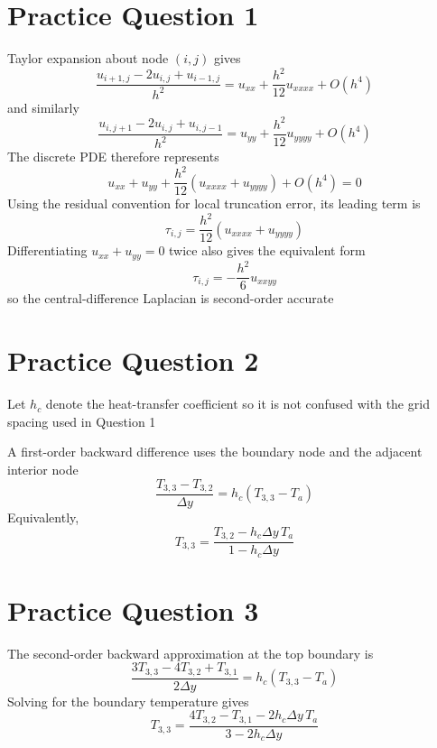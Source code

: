 \documentclass[a4paper]{exam}
\begin{document}
\section*{Practice Question 1}

\begin{solution}
  Taylor expansion about node \((i,j)\) gives
  \[
    \frac{u_{i+1,j} - 2u_{i,j} + u_{i-1,j}}{h^2} = u_{xx}
                                                   + \frac{h^2}{12}u_{xxxx}
                                                   + O(h^4)
  \]
  and similarly
  \[
    \frac{u_{i,j+1} - 2u_{i,j} + u_{i,j-1}}{h^2} = u_{yy}
                                                   + \frac{h^2}{12}u_{yyyy}
                                                   + O(h^4)
  \]
  The discrete PDE therefore represents
  \[
    u_{xx} + u_{yy} + \frac{h^2}{12}\left( u_{xxxx} + u_{yyyy} \right) + O(h^4) = 0
  \]
  Using the residual convention for local truncation error, its leading term is
  \[
    \boxed{
      \tau_{i,j}=\frac{h^2}{12}
      \left(u_{xxxx}+u_{yyyy}\right)
    }
  \]
  Differentiating \(u_{xx} + u_{yy} = 0\) twice also gives the equivalent form
  \[
    \boxed{\tau_{i,j}=-\frac{h^2}{6}u_{xxyy}}
  \]
  so the central-difference Laplacian is second-order accurate
\end{solution}

\section*{Practice Question 2}

\begin{solution}
  Let \(h_c\) denote the heat-transfer coefficient so it is not confused with
  the grid spacing used in Question 1

  A first-order backward difference uses the boundary node and the adjacent
  interior node
  \[
    \boxed{
      \frac{T_{3,3}-T_{3,2}}{\Delta y}
      =h_c\left(T_{3,3}-T_a\right)
    }
  \]
  Equivalently,
  \[
    \boxed{
      T_{3,3}
      =\frac{T_{3,2}-h_c\Delta y\,T_a}
      {1-h_c\Delta y}
    }
  \]
\end{solution}

\section*{Practice Question 3}

\begin{solution}
  The second-order backward approximation at the top boundary is
  \[
    \boxed{
      \frac{3T_{3,3}-4T_{3,2}+T_{3,1}}{2\Delta y}
      =h_c\left(T_{3,3}-T_a\right)
    }
  \]
  Solving for the boundary temperature gives
  \[
    \boxed{
      T_{3,3}
      =\frac{4T_{3,2}-T_{3,1}-2h_c\Delta y\,T_a}
      {3-2h_c\Delta y}
    }
  \]
\end{solution}
\end{document}
